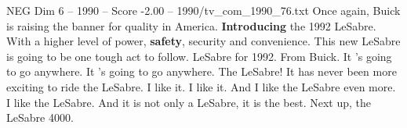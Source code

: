 \begin{textsample}{NEG Dim 6 – 1990 – Score -2.00 – 1990/tv\_com\_1990\_76.txt}  \label{ex:f6_neg_023}
Once again, Buick is raising the banner for quality in America. \textbf{Introducing} the 1992 LeSabre.
With a higher level of power, \textbf{safety}, security and convenience.
This new LeSabre is going to be one tough act to follow.
LeSabre for 1992.
From Buick.
It 's going to go anywhere.
It 's going to go anywhere.
The LeSabre!
It has never been more exciting to ride the LeSabre.
I like it.
I like it.
And I like the LeSabre even more.
I like the LeSabre.
And it is not only a LeSabre, it is the best.
Next up, the LeSabre 4000.

\end{textsample}
